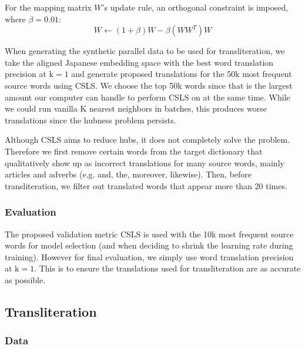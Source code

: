 \documentclass{article}
\begin{document}
\noindent
For the mapping matrix $W$'s update rule, an orthogonal constraint is imposed, where
$\beta=0.01$:
$$
W \leftarrow (1 + \beta)W - \beta(WW^T)W
$$

When generating the synthetic parallel data to be used for transliteration, we take
the aligned Japanese embedding space with the best word translation precision
at $\text{k}=1$ and generate proposed translations for the 50k most frequent
source words using CSLS. We choose the top 50k words since that is the largest
amount our computer can handle to perform CSLS on at the same time. While we could
run vanilla K nearest neighbors in batches, this produces worse translations
since the hubness problem persists.

Although CSLS aims to reduce hubs, it does not completely solve the problem.
Therefore we first remove certain words from the target dictionary that qualitatively
show up as incorrect translations for many source words, mainly articles
and adverbs (e.g. and, the, moreover, likewise).
Then, before transliteration, we filter out translated words that appear more than
20 times.

\subsubsection*{Evaluation}

The proposed validation metric CSLS is used with the 10k most frequent source words
for model selection (and when deciding to shrink the learning rate during training).
However for final evaluation, we simply use word translation precision at
$\text{k}=1$. This is to ensure the translations used for transliteration are as
accurate as possible.

\subsection*{Transliteration}

\subsubsection*{Data}
\end{document}
